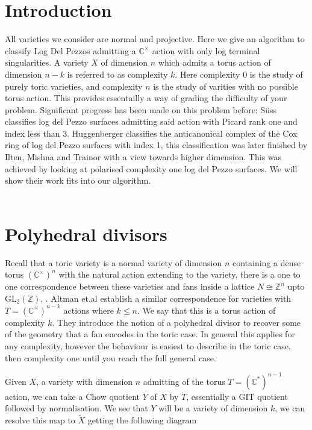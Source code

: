 \documentclass[11pt]{amsart}
\theoremstyle{plain}
\newcommand{\C}[1]{(\mathbb{C}^\times)^#1}
\begin{document}
 


\section{Introduction}

All varieties we consider are normal and projective. Here we give an algorithm to classify Log Del Pezzos admitting a $\mathbb{C}^\times$ action with only log terminal singularities. A variety $X$ of dimension $n$ which admits a torus action of dimension $n-k$ is referred to as complexity $k$. Here complexity 0 is the study of purely toric varieties, and complexity $n$ is the study of varities with no possible torus action. This provides essentailly a way of grading the difficulty of your problem. Significant progress has been made on this problem before: S\"{u}ss \cite{Suss} classifies log del Pezzo surfaces admitting said action with Picard rank one and index less than 3. Huggenberger \cite{Huggenberger} classifies the anticanonical complex of the Cox ring of log del Pezzo surfaces with index 1, this classification was later finished by Ilten, Mishna and Trainor \cite{IMT} with a view towards higher dimension. This was achieved by looking at polarised complexity one log del Pezzo surfaces. We will show their work fits into our algorithm. 
\\
\\
\section{Polyhedral divisors}
Recall that a toric variety is a  normal variety of dimension $n$ containing a dense torus $\C{n}$ with the natural action extending to the variety, there is a one to one correspondence between these varieties and fans inside a lattice $N \cong \mathbb{Z}^n$ upto GL$_2(\mathbb{Z})$, \cite{Cox}.
Altman et.al \cite{Altmann} establish a similar correspondence for varieties with $T = \C{{ n-k}}$ actions where $k \leq n$. We say that this is a torus action of complexity $k$. They introduce the notion of a polyhedral divisor to recover some of the geometry that a fan encodes in the toric case. In general this applies for any complexity, however the behaviour is easiest to describe in the toric case, then complexity one until you reach the full general case.


Given $X$, a variety with dimension $n$ admitting of the torus $ T = (\mathbb{C}^*)^{n-1}$ action, we can take a Chow quotient $Y$ of $X$ by $T$, essentially a GIT quotient followed by normalisation.  We see that $Y$ will be a variety of dimension $k$, we can resolve this map to $\tilde{X}$ getting the following diagram
\end{document}
